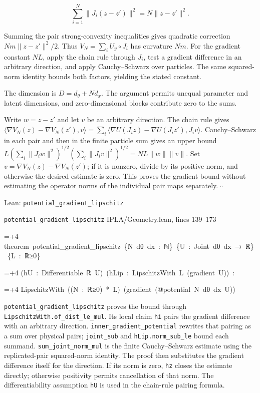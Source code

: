\documentclass[11pt,a4paper]{report}
\newlength{\leancharwidth}
\newenvironment{leancode}{\par\smallskip\begingroup\ttfamily\footnotesize\raggedright
  \settowidth{\leancharwidth}{M}\setlength{\parskip}{0pt}\setlength{\parindent}{0pt}
  \frenchspacing}{\par\endgroup\smallskip}
\newcommand{\leanline}[2]{\hangindent=\dimexpr#1\leancharwidth+4\leancharwidth\relax
  \hangafter=1\noindent\hspace*{#1\leancharwidth}#2\par}
\newcommand{\leansource}[1]{\par{\footnotesize\color{leanmuted}#1}\par}
\newcommand{\leanlabel}[1]{\par\smallskip\noindent{\small\bfseries #1}\par}
\begin{document}
\[\sum_{i=1}^N\|J_i(z-z')\|^2=N\|z-z'\|^2.\]

Summing the pair strong-convexity inequalities gives quadratic correction \(Nm\|z-z'\|^2/2\). Thus \(V_N=\sum_iU_y\circ J_i\) has curvature \(Nm\). For the gradient constant \(NL\), apply the chain rule through \(J_i\), test a gradient difference in an arbitrary direction, and apply Cauchy–Schwarz over particles. The same squared-norm identity bounds both factors, yielding the stated constant.



The dimension is \(D=d_\theta+Nd_x\). The argument permits unequal parameter and latent dimensions, and zero-dimensional blocks contribute zero to the sums.




Write \(w=z-z'\) and let \(v\) be an arbitrary direction. The chain rule gives \(\langle\nabla V_N(z)-\nabla V_N(z'),v\rangle=\sum_i\langle\nabla U(J_i z)-\nabla U(J_i z'),J_i v\rangle\). Cauchy–Schwarz in each pair and then in the finite particle sum gives an upper bound \(L(\sum_i\|J_iw\|^2)^{1/2}(\sum_i\|J_iv\|^2)^{1/2}=NL\|w\|\|v\|\). Set \(v=\nabla V_N(z)-\nabla V_N(z')\); if it is nonzero, divide by its positive norm, and otherwise the desired estimate is zero. This proves the gradient bound without estimating the operator norms of the individual pair maps separately. \(\square\)

\begin{leanbox}{Lean: \texttt{potential\_\allowbreak{}gradient\_\allowbreak{}lipschitz}}
\leansource{\texttt{potential\_\allowbreak{}gradient\_\allowbreak{}lipschitz} \quad IPLA/\allowbreak{}Geometry.lean, lines 139–173}
\begin{leancode}
\leanline{0}{theorem\ potential\_gradient\_lipschitz\ \{N\ dθ\ dx\ :\ ℕ\}\ \{U\ :\ Joint\ dθ\ dx\ →\ ℝ\}\ \{L\ :\ ℝ≥0\}}
\leanline{4}{(hU\ :\ Differentiable\ ℝ\ U)\ (hLip\ :\ LipschitzWith\ L\ (gradient\ U))\ :}
\leanline{4}{LipschitzWith\ ((N\ :\ ℝ≥0)\ *\ L)\ (gradient\ (@potential\ N\ dθ\ dx\ U))}
\end{leancode}
\leanlabel{How the Lean proof follows the argument}
\texttt{potential\_\allowbreak{}gradient\_\allowbreak{}lipschitz} proves the bound through \texttt{Lipschitz\allowbreak{}With.\allowbreak{}of\_\allowbreak{}dist\_\allowbreak{}le\_\allowbreak{}mul}. Its local claim \texttt{hi} pairs the gradient difference with an arbitrary direction. \texttt{inner\_\allowbreak{}gradient\_\allowbreak{}potential} rewrites that pairing as a sum over physical pairs; \texttt{joint\_\allowbreak{}sub} and \texttt{h\allowbreak{}Lip.\allowbreak{}norm\_\allowbreak{}sub\_\allowbreak{}le} bound each summand. \texttt{sum\_\allowbreak{}joint\_\allowbreak{}norm\_\allowbreak{}mul} is the finite Cauchy–Schwarz estimate using the replicated-pair squared-norm identity. The proof then substitutes the gradient difference itself for the direction. If its norm is zero, \texttt{hz} closes the estimate directly; otherwise positivity permits cancellation of that norm. The differentiability assumption \texttt{h\allowbreak{}U} is used in the chain-rule pairing formula.
\end{leanbox}
\end{document}
